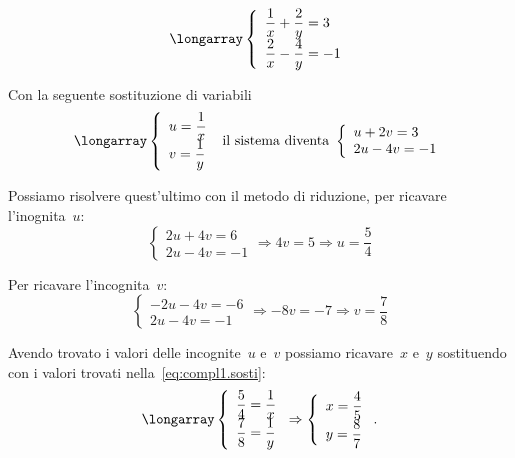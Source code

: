  \begin{esempio}
\[\longarray\left\{\begin{array}{l}
  \dfrac{1}{x}+\dfrac{2}{y}=3\\
  \dfrac{2}{x}-\dfrac{4}{y}=-1 
\end{array}\right.\]

 
Con la seguente sostituzione di variabili
\label{eq:compl1.sosti}
\[\longarray\left\{\begin{array}{l}
  u=\dfrac{1}{x}\\
  v=\dfrac{1}{y}
\end{array}\right.
 \text{ il sistema diventa }
\left\{\begin{array}{l}
  u+2v=3 \\
  2u-4v=-1 
\end{array}\right.\]


Possiamo risolvere quest'ultimo con il metodo di riduzione, 
per ricavare l'inognita~$u$:
\[\left\{\begin{array}{l}
2u+4v=6 \\
2u-4v=-1
\end{array}\right. \Rightarrow 4v=5 \Rightarrow u=\frac{5}{4}\]

Per ricavare l'incognita~$v$:
\[\left\{\begin{array}{l}
-2u-4v=-6 \\
2u-4v=-1 \end{array}\right. \Rightarrow -8v=-7 \Rightarrow v=\frac{7}{8}\]

Avendo trovato i valori delle incognite~$u$ e~$v$ possiamo ricavare~$x$ 
e~$y$ sostituendo con i valori trovati nella~\ref{eq:compl1.sosti}:
\[\longarray\left\{\begin{array}{l}
  \dfrac{5}{4}=\dfrac{1}{x}\\
  \dfrac{7}{8}=\dfrac{1}{y}
\end{array}\right.
\Rightarrow
\left\{\begin{array}{l}
  x=\dfrac{4}{5}\\
  y=\dfrac{8}{7}
\end{array}\right..\]
 \end{esempio}

